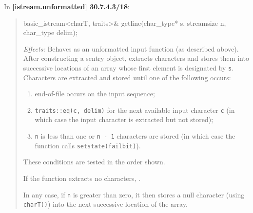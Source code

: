 \documentclass{wg21}
\begin{document}
In \textbf{[istream.unformatted] 30.7.4.3/18}:
\begin{quote}
\begin{codeblock}
basic_istream<charT, traits>& getline(char_type* s, streamsize n, char_type delim);
\end{codeblock}
\textit{Effects:} Behaves as an unformatted input function (as described above).
After constructing a sentry object, extracts characters and stores them into
successive locations of an array whose first element is designated by \texttt{s}.
Characters are extracted and stored until one of the following occurs:
\begin{enumerate}
  \item end-of-file occurs on the input sequence;
  \item \texttt{traits::eq(c, delim)} for the next available input character
        \texttt{c} (in which case the input character is extracted but not stored);
  \item \texttt{n} is less than one or \texttt{n - 1} characters are stored
        (in which case the function calls \texttt{setstate(failbit)}).
\end{enumerate}

These conditions are tested in the order shown.

If the function extracts no characters, .

In any case, if \texttt{n} is greater than zero, it then stores a null character
(using \texttt{charT()}) into the next successive location of the array.
\end{quote}
\end{document}
